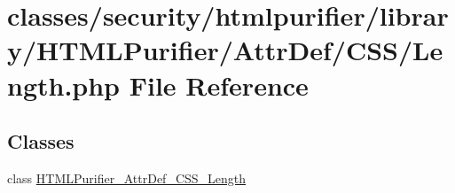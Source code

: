 \hypertarget{AttrDef_2CSS_2Length_8php}{\section{classes/security/htmlpurifier/library/\+H\+T\+M\+L\+Purifier/\+Attr\+Def/\+C\+S\+S/\+Length.php File Reference}
\label{AttrDef_2CSS_2Length_8php}
}
\subsection*{Classes}
\begin{DoxyCompactItemize}
\item 
class \hyperlink{classHTMLPurifier__AttrDef__CSS__Length}{H\+T\+M\+L\+Purifier\+\_\+\+Attr\+Def\+\_\+\+C\+S\+S\+\_\+\+Length}
\end{DoxyCompactItemize}
